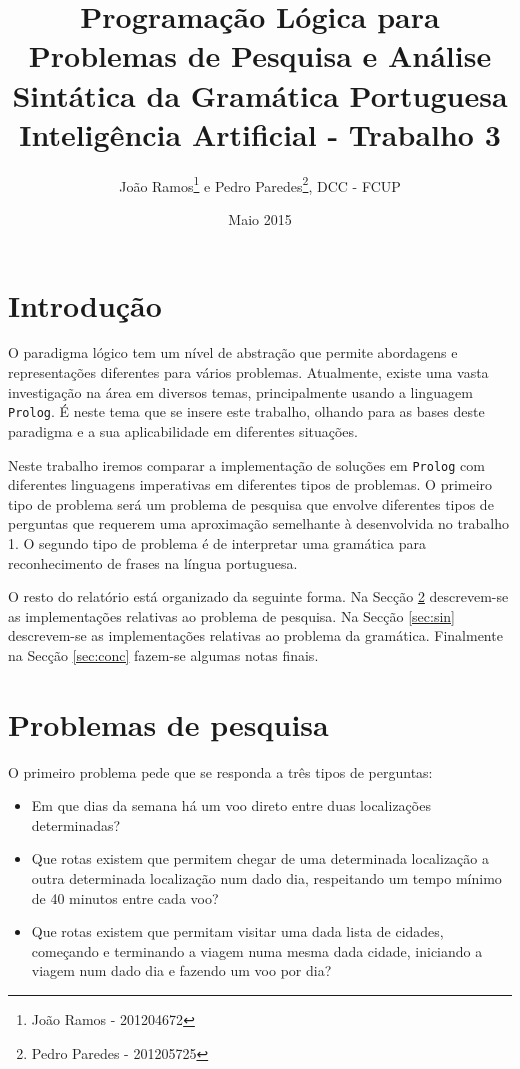 \documentclass[12pt,a4paper,oneside]{article}
\title{Programação Lógica para Problemas de Pesquisa e Análise Sintática da Gramática Portuguesa\\
  \vspace{0.1in}
  \large{Inteligência Artificial - Trabalho 3}
}
\author{João Ramos\footnote{João Ramos - 201204672} e Pedro Paredes\footnote{Pedro Paredes - 201205725}, DCC - FCUP}
\date{Maio 2015}
\begin{document}
\maketitle


\section{Introdução}
\label{sec:intro}

O paradigma lógico tem um nível de abstração que permite abordagens e
representações diferentes para vários problemas. Atualmente, existe
uma vasta investigação na área em diversos temas, principalmente
usando a linguagem \texttt{Prolog}. É neste tema que se insere este
trabalho, olhando para as bases deste paradigma e a sua aplicabilidade
em diferentes situações.

Neste trabalho iremos comparar a implementação de soluções em
\texttt{Prolog} com diferentes linguagens imperativas em diferentes
tipos de problemas. O primeiro tipo de problema será um problema de
pesquisa que envolve diferentes tipos de perguntas que requerem uma
aproximação semelhante à desenvolvida no trabalho 1. O segundo tipo de
problema é de interpretar uma gramática para reconhecimento de frases
na língua portuguesa.

O resto do relatório está organizado da seguinte forma. Na Secção
\ref{sec:pes} descrevem-se as implementações relativas ao problema de
pesquisa. Na Secção \ref{sec:sin} descrevem-se as implementações
relativas ao problema da gramática. Finalmente na Secção
\ref{sec:conc} fazem-se algumas notas finais.


\section{Problemas de pesquisa}
\label{sec:pes}

O primeiro problema pede que se responda a três tipos de perguntas:

\begin{itemize}
\item Em que dias da semana há um voo direto entre duas localizações
  determinadas?
\item Que rotas existem que permitem chegar de uma determinada
  localização a outra determinada localização num dado dia,
  respeitando um tempo mínimo de 40 minutos entre cada voo?
\item Que rotas existem que permitam visitar uma dada lista de
  cidades, começando e terminando a viagem numa mesma dada cidade,
  iniciando a viagem num dado dia e fazendo um voo por dia?
\end{itemize}
\end{document}
